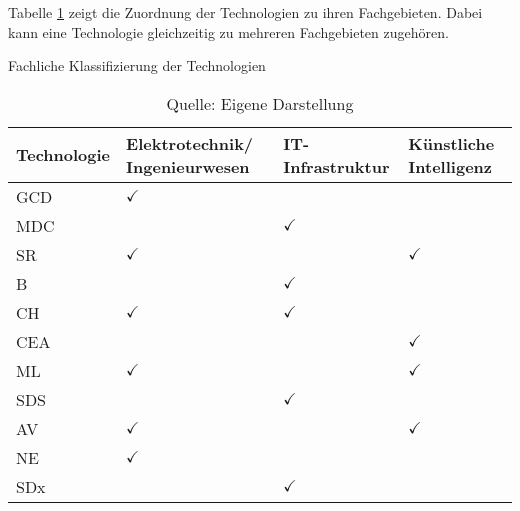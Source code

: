 Tabelle \ref{tab:class_tech} zeigt die Zuordnung der Technologien zu ihren Fachgebieten. Dabei kann eine Technologie gleichzeitig zu mehreren Fachgebieten zugehören.

\begin{table}
	\caption{Fachliche Klassifizierung der Technologien}
	\selectfont
	\footnotesize
	\centering
	\label{tab:class_tech}
	\begin{tabularx}{\linewidth}{XXXX}
		Technologie & Elektrotechnik/ Ingenieurwesen & IT-Infrastruktur & Künstliche Intelligenz \\
		\hline
		\acs{GCD} & $\checkmark$ & & \\
		\acs{MDC} & & $\checkmark$ & \\
		\acs{SR} & $\checkmark$ & & $\checkmark$ \\
		\acs{B} & & $\checkmark$ & \\
		\acs{CH} & $\checkmark$ & $\checkmark$ & \\
		\acs{CEA} & & & $\checkmark$ \\
		\acs{ML} & $\checkmark$ & & $\checkmark$ \\
		\acs{SDS} & & $\checkmark$ & \\
		\acs{AV} & $\checkmark$ & & $\checkmark$ \\
		\acs{NE} & $\checkmark$ & & \\
		\acs{SDx} & & $\checkmark$ & \\
	\end{tabularx}
	\caption*{Quelle: Eigene Darstellung}
\end{table}